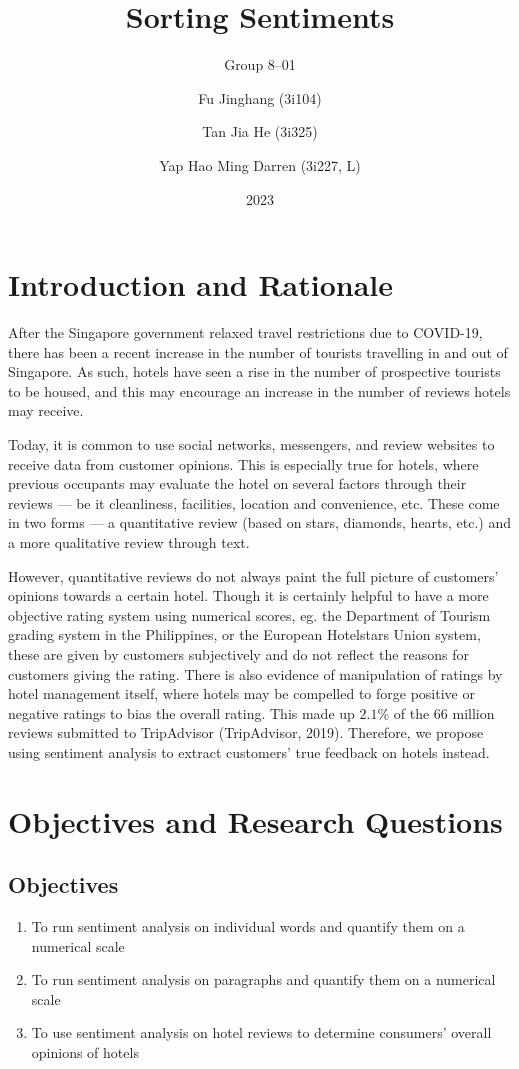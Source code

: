 \documentclass[12pt,bibliography=totocnumbered]{scrartcl}
\title{Sorting Sentiments}
\subtitle{Group 8--01}
\author{
	Fu Jinghang (3i104) \and
	Tan Jia He (3i325) \and
	Yap Hao Ming Darren (3i227, L)
}
\date{2023}
\begin{document}
\pagestyle{scrheadings}
\doublespacing

\maketitle
\pagebreak
\tableofcontents
\pagebreak

\section{Introduction and Rationale}
After the Singapore government relaxed travel restrictions due to COVID-19,
there has been a recent increase in the number of tourists travelling in and out of Singapore.
As such, hotels have seen a rise in the number of prospective tourists to be housed,
and this may encourage an increase in the number of reviews hotels may receive.

Today, it is common to use social networks, messengers, and review websites
to receive data from customer opinions. This is especially true for hotels,
where previous occupants may evaluate the hotel on several factors through their
reviews --- be it cleanliness, facilities, location and convenience, etc.
These come in two forms --- a quantitative review (based on stars, diamonds, hearts, etc.)
and a more qualitative review through text.

However, quantitative reviews do not always paint the full picture of customers'
opinions towards a certain hotel. Though it is certainly helpful to have a more
objective rating system using numerical scores, eg. the Department of Tourism grading system in
the Philippines, or the European Hotelstars Union system,
these are given by customers subjectively and do not reflect the reasons for customers giving the rating.
There is also evidence of manipulation of ratings by hotel management itself, where hotels may be
compelled to forge positive or negative ratings to bias the overall rating.
This made up $2.1\%$ of the $66$ million reviews submitted to TripAdvisor (TripAdvisor, 2019). %
Therefore, we propose using sentiment analysis to extract customers' true feedback on hotels instead.

\section{Objectives and Research Questions}
\subsection{Objectives}
\begin{enumerate}
	\item To run sentiment analysis on individual words and quantify them on a numerical scale
	\item To run sentiment analysis on paragraphs and quantify them on a numerical scale
	\item To use sentiment analysis on hotel reviews to determine consumers' overall opinions of hotels
\end{enumerate}
\end{document}
